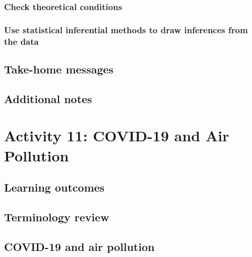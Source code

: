 \documentclass[
]{report}
\begin{document}
\hypertarget{check-theoretical-conditions}{%
\subsubsection*{Check theoretical conditions}\label{check-theoretical-conditions}}

\hypertarget{use-statistical-inferential-methods-to-draw-inferences-from-the-data}{%
\subsubsection*{Use statistical inferential methods to draw inferences from the data}\label{use-statistical-inferential-methods-to-draw-inferences-from-the-data}}

\hypertarget{take-home-messages-17}{%
\subsection{Take-home messages}\label{take-home-messages-17}}

\hypertarget{additional-notes-16}{%
\subsection{Additional notes}\label{additional-notes-16}}

\hypertarget{activity-11-covid-19-and-air-pollution}{%
\section{Activity 11: COVID-19 and Air Pollution}\label{activity-11-covid-19-and-air-pollution}}

\hypertarget{learning-outcomes-21}{%
\subsection{Learning outcomes}\label{learning-outcomes-21}}

\hypertarget{terminology-review-18}{%
\subsection{Terminology review}\label{terminology-review-18}}

\hypertarget{covid-19-and-air-pollution}{%
\subsection{COVID-19 and air pollution}\label{covid-19-and-air-pollution}}
\end{document}
